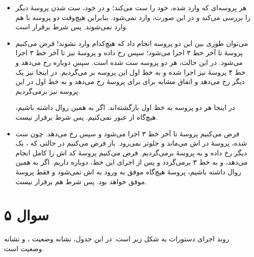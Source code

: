 \documentclass{article}
\begin{document}
	\begin{itemize}
		\item
		هر پروسه‌ای که وارد
		شده،
		خود را ست می‌کند؛ و در
		خود، ست شدن
		پروسهٔ دیگر را بررسی می‌کند و در این صورت، وارد
		نمی‌شود. بنابراین هیچ‌وقت دو پروسه با هم وارد
		نمی‌شوند. پس شرط
		برقرار است.

		\item
		می‌توان طوری بین این دو پروسه
		انجام داد که هیچ‌کدام وارد
		نشوند! فرض می‌کنیم پروسهٔ
		تا آخر خط ۳ اجرا می‌شود؛ سپس
		رخ داده و پروسهٔ
		نیز تا آخر خط ۳ اجرا می‌شود. در این حالت،
		هر دو پروسه ست شده است. سپس دوباره
		رخ می‌دهد و خط ۴ پروسه‌ٔ
		نیز اجرا شده و به خط اول این پروسه بر می‌گردیم. در اینجا نیز یک
		دیگر رخ می‌دهد و اتفاق مشابه برای برای پروسهٔ
		رخ می‌دهد و به خط اول در این پروسه نیز برمی‌گردیم.

		در اینجا هر دو پروسه به خط اول بازگشته‌اند. اگر به همین روال
		داشته باشیم، هیچ‌گاه از
		عبور نمی‌کنیم. پس شرط
		برقرار نیست.

		\item
		فرض می‌کنیم پروسهٔ
		تا آخر خط ۳ اجرا می‌شود و سپس
		رخ می‌دهد. چون
		ست شده، پروسهٔ
		در
		اش
		می‌ماند و جلوتر نمی‌رود. باز فرض می‌کنیم در حالتی که
		،
		یک
		دیگر رخ داده و به پروسهٔ
		برمی‌گردیم. فرض می‌کنیم پروسهٔ
		کد
		اش
		را کامل انجام می‌دهد، و به خط ۳ برمی‌گردد و پس از اجرای این خط، دوباره
		داریم. اگر به همین روال
		داشته باشیم، پروسهٔ
		هیچ‌گاه موفق به ورود به
		اش
		نمی‌شود و فقط پروسهٔ
		موفق خواهد بود. پس شرط
		هم برقرار نیست.
	\end{itemize}

	\section*{سوال ۵}
	\paragraph*{}
	روند اجرای دستورات به شکل زیر است. در این جدول،
	نشانه وضعیت
	،
	و
	نشانه وضعیت
	است.
\end{document}

